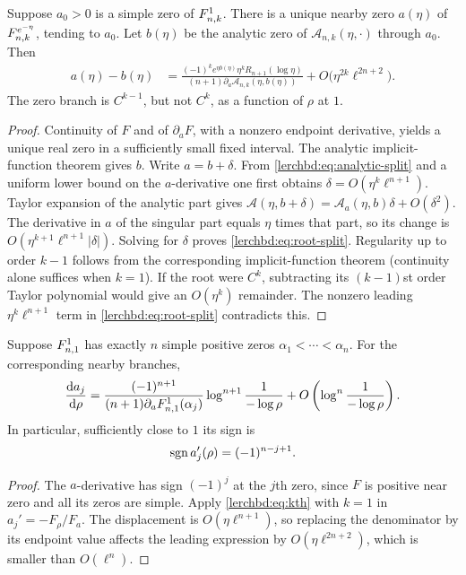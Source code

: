 \begin{theorem}\label{lerchbd:thm:rootregularity}
Suppose $a_0>0$ is a simple zero of $F_{n,k}^{1}$. There is a unique nearby zero $a(\eta)$ of $F_{n,k}^{e^{-\eta}}$, tending to $a_0$. Let $b(\eta)$ be the analytic zero of $\mathcal A_{n,k}(\eta,\cdot)$ through $a_0$. Then
\begin{align}\label{lerchbd:eq:root-split}
 a(\eta)-b(\eta)
 &=\frac{(-1)^k e^{\eta b(\eta)}\eta^k R_{n+1}(\log\eta)}
 {(n+1)\partial_a\mathcal A_{n,k}(\eta,b(\eta))}
 +O\bigl(\eta^{2k}\ell^{2n+2}\bigr).
\end{align}
The zero branch is $C^{k-1}$, but not $C^k$, as a function of $\rho$ at $1$.
\end{theorem}
\begin{proof}
Continuity of $F$ and of $\partial_aF$, with a nonzero endpoint derivative, yields a unique real zero in a sufficiently small fixed interval. The analytic implicit-function theorem gives $b$. Write $a=b+\delta$. From \eqref{lerchbd:eq:analytic-split} and a uniform lower bound on the $a$-derivative one first obtains $\delta=O(\eta^k\ell^{n+1})$. Taylor expansion of the analytic part gives $\mathcal A(\eta,b+\delta)=\mathcal A_a(\eta,b)\delta+O(\delta^2)$. The derivative in $a$ of the singular part equals $\eta$ times that part, so its change is $O(\eta^{k+1}\ell^{n+1}|\delta|)$. Solving for $\delta$ proves \eqref{lerchbd:eq:root-split}. Regularity up to order $k-1$ follows from the corresponding implicit-function theorem (continuity alone suffices when $k=1$). If the root were $C^k$, subtracting its $(k-1)$st order Taylor polynomial would give an $O(\eta^k)$ remainder. The nonzero leading $\eta^k\ell^{n+1}$ term in \eqref{lerchbd:eq:root-split} contradicts this.
\end{proof}

\begin{corollary}\label{lerchbd:cor:alternating}
Suppose $F_{n,1}^{1}$ has exactly $n$ simple positive zeros $\alpha_1<\cdots<\alpha_n$. For the corresponding nearby branches,
\begin{equation}\label{lerchbd:eq:direction-asympt}
 \frac{\mathrm d a_j}{\mathrm d\rho}
 =\frac{(-1)^{n+1}}{(n+1)\partial_aF_{n,1}^{1}(\alpha_j)}
   \log^{n+1}\frac1{-\log\rho}
 +O\left(\log^n\frac1{-\log\rho}\right).
\end{equation}
In particular, sufficiently close to $1$ its sign is
\begin{equation}\label{lerchbd:eq:direction}
 \operatorname{sgn} a_j'(\rho)=(-1)^{n-j+1}.
\end{equation}
\end{corollary}
\begin{proof}
The $a$-derivative has sign $(-1)^j$ at the $j$th zero, since $F$ is positive near zero and all its zeros are simple. Apply \eqref{lerchbd:eq:kth} with $k=1$ in $a_j'=-F_\rho/F_a$. The displacement is $O(\eta\ell^{n+1})$, so replacing the denominator by its endpoint value affects the leading expression by $O(\eta\ell^{2n+2})$, which is smaller than $O(\ell^n)$.
\end{proof}

